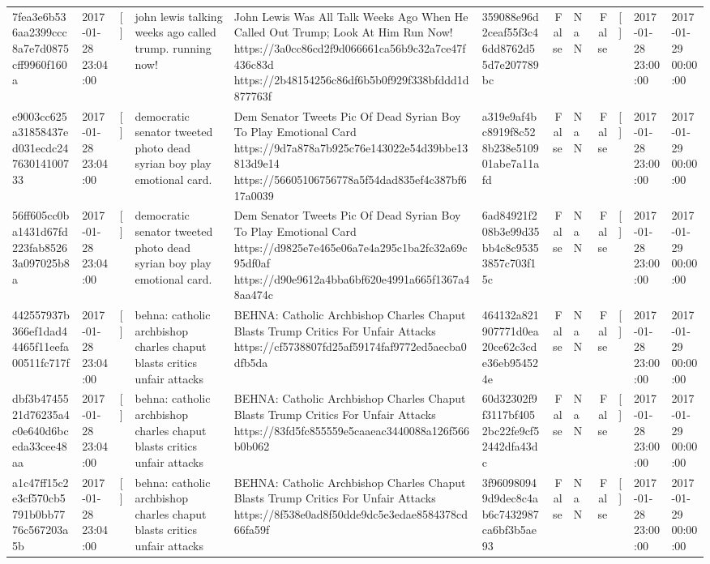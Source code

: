 \begin{tabular}{llllllrlrlll}
7fea3e6b536aa2399ccc8a7e7d0875cff9960f160a & 2017-01-28 23:04:00 & [] & john lewis talking weeks ago called trump. running now! & John Lewis Was All Talk Weeks Ago When He Called Out Trump; Look At Him Run Now! https://3a0cc86cd2f9d066661ca56b9c32a7ce47f436c83d https://2b48154256c86df6b5b0f929f338bfddd1d877763f & 359088e96d2ceaf55f3c46dd8762d55d7e207789bc & False & NaN & False & [] & 2017-01-28 23:00:00 & 2017-01-29 00:00:00 \\
e9003cc625a31858437ed031ecdc24763014100733 & 2017-01-28 23:04:00 & [] & democratic senator tweeted photo dead syrian boy play emotional card. & Dem Senator Tweets Pic Of Dead Syrian Boy To Play Emotional Card https://9d7a878a7b925c76e143022e54d39bbe13813d9e14 https://56605106756778a5f54dad835ef4c387bf617a0039 & a319e9af4bc8919f8c528b238e510901abe7a11afd & False & NaN & False & [] & 2017-01-28 23:00:00 & 2017-01-29 00:00:00 \\
56ff605cc0ba1431d67fd223fab85263a097025b8a & 2017-01-28 23:04:00 & [] & democratic senator tweeted photo dead syrian boy play emotional card. & Dem Senator Tweets Pic Of Dead Syrian Boy To Play Emotional Card https://d9825e7e465e06a7e4a295c1ba2fc32a69c95df0af https://d90e9612a4bba6bf620e4991a665f1367a48aa474c & 6ad84921f208b3e99d35bb4c8c95353857c703f15c & False & NaN & False & [] & 2017-01-28 23:00:00 & 2017-01-29 00:00:00 \\
442557937b366ef1dad44465f11eefa00511fc717f & 2017-01-28 23:04:00 & [] & behna: catholic archbishop charles chaput blasts critics unfair attacks & BEHNA: Catholic Archbishop Charles Chaput Blasts Trump Critics For Unfair Attacks https://cf5738807fd25af59174faf9772ed5aecba0dfb5da & 464132a821907771d0ea20ce62c3cde36eb954524e & False & NaN & False & [] & 2017-01-28 23:00:00 & 2017-01-29 00:00:00 \\
dbf3b4745521d76235a4c0e640d6bceda33cee48aa & 2017-01-28 23:04:00 & [] & behna: catholic archbishop charles chaput blasts critics unfair attacks & BEHNA: Catholic Archbishop Charles Chaput Blasts Trump Critics For Unfair Attacks https://83fd5fc855559e5caaeac3440088a126f566b0b062 & 60d32302f9f3117bf4052bc22fe9cf52442dfa43dc & False & NaN & False & [] & 2017-01-28 23:00:00 & 2017-01-29 00:00:00 \\
a1c47ff15c2e3cf570cb5791b0bb7776c567203a5b & 2017-01-28 23:04:00 & [] & behna: catholic archbishop charles chaput blasts critics unfair attacks & BEHNA: Catholic Archbishop Charles Chaput Blasts Trump Critics For Unfair Attacks https://8f538e0ad8f50dde9dc5e3edae8584378cd66fa59f & 3f960980949d9dec8c4ab6c7432987ca6bf3b5ae93 & False & NaN & False & [] & 2017-01-28 23:00:00 & 2017-01-29 00:00:00 \\

\end{tabular}
